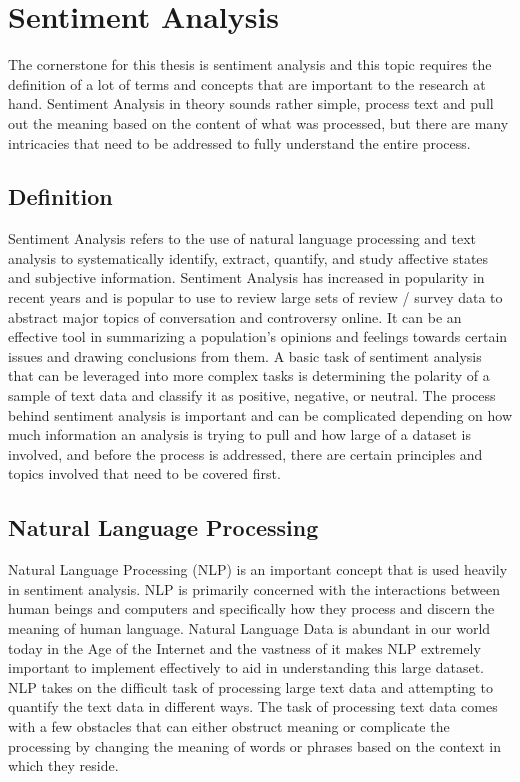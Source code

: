 \section{Sentiment Analysis}
The cornerstone for this thesis is sentiment analysis and this topic requires the definition of a lot of terms and concepts that are important to the research at hand.
Sentiment Analysis in theory sounds rather simple, process text and pull out the meaning based on the content of what was processed, but there are many intricacies that need to be addressed to fully understand the entire process.

\subsection{Definition}
Sentiment Analysis refers to the use of natural language processing and text analysis to systematically identify, extract, quantify, and study affective states and subjective information.
Sentiment Analysis has increased in popularity in recent years and is popular to use to review large sets of review / survey data to abstract major topics of conversation and controversy online.
It can be an effective tool in summarizing a population's opinions and feelings towards certain issues and drawing conclusions from them.
A basic task of sentiment analysis that can be leveraged into more complex tasks is determining the polarity of a sample of text data and classify it as positive, negative, or neutral.
The process behind sentiment analysis is important and can be complicated depending on how much information an analysis is trying to pull and how large of a dataset is involved, and before the process is addressed, there are certain principles and topics involved that need to be covered first.

\subsection{Natural Language Processing}
Natural Language Processing (NLP) is an important concept that is used heavily in sentiment analysis.
NLP is primarily concerned with the interactions between human beings and computers and specifically how they process and discern the meaning of human language.
Natural Language Data is abundant in our world today in the Age of the Internet and the vastness of it makes NLP extremely important to implement effectively to aid in understanding this large dataset.
NLP takes on the difficult task of processing large text data and attempting to quantify the text data in different ways.
The task of processing text data comes with a few obstacles that can either obstruct meaning or complicate the processing by changing the meaning of words or phrases based on the context in which they reside.

